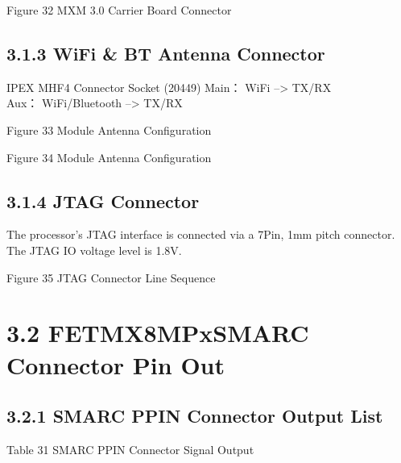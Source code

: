 \documentclass[letterpaper,10pt,openany,english]{sphinxmanual}
\begin{document}
\sphinxAtStartPar
{}

\sphinxAtStartPar
Figure 3\sphinxhyphen{}2 MXM 3.0 Carrier Board Connector


\subsection{3.1.3 Wi\sphinxhyphen{}Fi \& BT Antenna Connector}
\label{\detokenize{hardware:wi-fi-bt-antenna-connector}}
\sphinxAtStartPar
I\sphinxhyphen{}PEX MHF4 Connector Socket (20449) Main： Wi\sphinxhyphen{}Fi –> TX/RX\\
Aux： Wi\sphinxhyphen{}Fi/Bluetooth –> TX/RX

\sphinxAtStartPar
{}

\sphinxAtStartPar
Figure 3\sphinxhyphen{}3 Module Antenna Configuration

\sphinxAtStartPar
{}

\sphinxAtStartPar
Figure 3\sphinxhyphen{}4 Module Antenna Configuration


\subsection{3.1.4 JTAG  Connector}
\label{\detokenize{hardware:jtag-connector}}
\sphinxAtStartPar
The processor’s JTAG interface is connected via a 7Pin, 1mm pitch connector.\\
The JTAG IO voltage level is 1.8V.

\sphinxAtStartPar
{}

\sphinxAtStartPar
Figure 3\sphinxhyphen{}5 JTAG Connector Line Sequence


\section{3.2 FET\sphinxhyphen{}MX8MPx\sphinxhyphen{}SMARC Connector Pin Out}
\label{\detokenize{hardware:fet-mx8mpx-smarc-connector-pin-out}}

\subsection{3.2.1 SMARC P\sphinxhyphen{}PIN Connector Output List}
\label{\detokenize{hardware:smarc-p-pin-connector-output-list}}
\sphinxAtStartPar
Table 3\sphinxhyphen{}1 SMARC P\sphinxhyphen{}PIN Connector Signal Output
\end{document}
